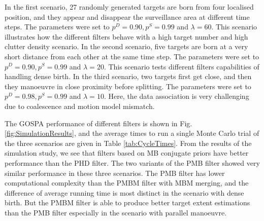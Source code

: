 \documentclass[conference]{IEEEtran}
\begin{document}
In the first scenario, 27 randomly generated targets are born from four localised position, and they appear and disappear the surveillance area at different time steps. The parameters were set to $p^D = 0.90, p^S = 0.99$ and $ \lambda = 60$. This scenario illustrates how the different filters behave with a high target number and high clutter density scenario. In the second scenario, five targets are born at a very short distance from each other at the same time step. The parameters were set to $p^D = 0.90, p^S = 0.99$ and $ \lambda = 20$. This scenario tests different filters capabilities of handling dense birth. In the third scenario, two targets first get close, and then they manoeuvre in close proximity before splitting. The parameters were set to $p^D = 0.98, p^S = 0.99$ and $ \lambda = 10$. Here, the data association is very challenging due to coalescence and motion model mismatch.


The GOSPA performance of different filters is shown in Fig. \ref{fig:SimulationResults}, and the average times to run a single Monte Carlo trial of the three scenarios are given in Table \ref{tab:CycleTimes}. From the results of the simulation study, we see that filters based on MB conjugate priors have better performance than the PHD filter. The two variants of the PMB filter showed very similar performance in these three scenarios. The PMB filter has lower computational complexity than the PMBM filter with MBM merging, and the difference of average running time is most distinct in the scenario with dense birth. But the PMBM filter is able to produce better target extent estimations than the PMB filter especially in the scenario with parallel manoeuvre.



\end{document}
